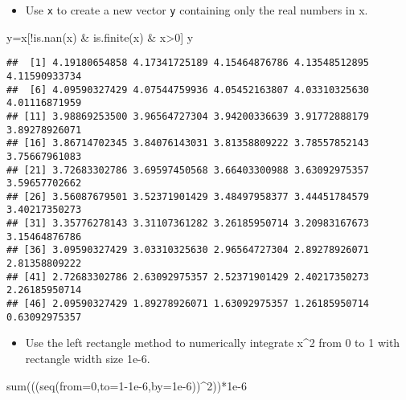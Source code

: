 \documentclass[
]{article}
\newenvironment{Shaded}{\begin{snugshade}}{\end{snugshade}}
\newcommand{\AttributeTok}[1]{\textcolor[rgb]{0.77,0.63,0.00}{#1}}
\newcommand{\DecValTok}[1]{\textcolor[rgb]{0.00,0.00,0.81}{#1}}
\newcommand{\FloatTok}[1]{\textcolor[rgb]{0.00,0.00,0.81}{#1}}
\newcommand{\FunctionTok}[1]{\textcolor[rgb]{0.00,0.00,0.00}{#1}}
\newcommand{\NormalTok}[1]{#1}
\newcommand{\OtherTok}[1]{\textcolor[rgb]{0.56,0.35,0.01}{#1}}
\newcommand{\SpecialCharTok}[1]{\textcolor[rgb]{0.00,0.00,0.00}{#1}}
\providecommand{\tightlist}{%
  \setlength{\itemsep}{0pt}\setlength{\parskip}{0pt}}
\begin{document}
\begin{itemize}
\tightlist
\item
  Use \texttt{x} to create a new vector \texttt{y} containing only the
  real numbers in x.
\end{itemize}

\begin{Shaded}
\begin{Highlighting}[]
\NormalTok{y}\OtherTok{=}\NormalTok{x[}\SpecialCharTok{!}\FunctionTok{is.nan}\NormalTok{(x) }\SpecialCharTok{\&} \FunctionTok{is.finite}\NormalTok{(x) }\SpecialCharTok{\&}\NormalTok{ x}\SpecialCharTok{\textgreater{}}\DecValTok{0}\NormalTok{]}
\NormalTok{y}
\end{Highlighting}
\end{Shaded}

\begin{verbatim}
##  [1] 4.19180654858 4.17341725189 4.15464876786 4.13548512895 4.11590933734
##  [6] 4.09590327429 4.07544759936 4.05452163807 4.03310325630 4.01116871959
## [11] 3.98869253500 3.96564727304 3.94200336639 3.91772888179 3.89278926071
## [16] 3.86714702345 3.84076143031 3.81358809222 3.78557852143 3.75667961083
## [21] 3.72683302786 3.69597450568 3.66403300988 3.63092975357 3.59657702662
## [26] 3.56087679501 3.52371901429 3.48497958377 3.44451784579 3.40217350273
## [31] 3.35776278143 3.31107361282 3.26185950714 3.20983167673 3.15464876786
## [36] 3.09590327429 3.03310325630 2.96564727304 2.89278926071 2.81358809222
## [41] 2.72683302786 2.63092975357 2.52371901429 2.40217350273 2.26185950714
## [46] 2.09590327429 1.89278926071 1.63092975357 1.26185950714 0.63092975357
\end{verbatim}

\begin{itemize}
\tightlist
\item
  Use the left rectangle method to numerically integrate x\^{}2 from 0
  to 1 with rectangle width size 1e-6.
\end{itemize}

\begin{Shaded}
\begin{Highlighting}[]
\FunctionTok{sum}\NormalTok{(((}\FunctionTok{seq}\NormalTok{(}\AttributeTok{from=}\DecValTok{0}\NormalTok{,}\AttributeTok{to=}\DecValTok{1}\FloatTok{{-}1e{-}6}\NormalTok{,}\AttributeTok{by=}\FloatTok{1e{-}6}\NormalTok{))}\SpecialCharTok{\^{}}\DecValTok{2}\NormalTok{))}\SpecialCharTok{*}\FloatTok{1e{-}6}
\end{Highlighting}
\end{Shaded}
\end{document}
